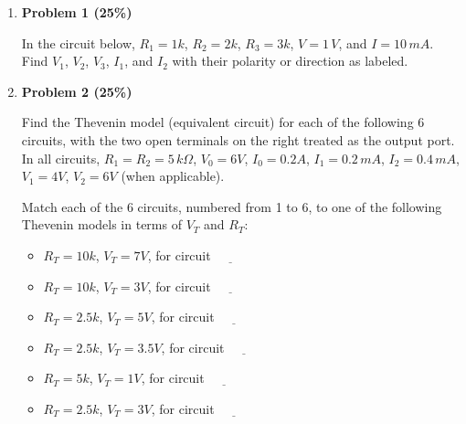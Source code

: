 \documentclass[12pt]{article}
\begin{document}
\begin{enumerate}

\item {\bf Problem 1 (25\%)} 

In the circuit below, $R_1=1k$, $R_2=2k$, $R_3=3k$, $V=1\,V$, and $I=10\,mA$.
Find $V_1$, $V_2$, $V_3$, $I_1$, and $I_2$ with their polarity or direction
as labeled.





\item {\bf Problem 2 (25\%)} 

Find the Thevenin model (equivalent circuit) for each of the following 6
circuits, with the two open terminals on the right treated as the output
port. In all circuits, $R_1=R_2=5\,k\Omega$, $V_0=6V$, $I_0=0.2A$, $I_1=0.2\,mA$,
$I_2=0.4\,mA$, $V_1=4V$, $V_2=6V$ (when applicable).

Match each of the 6 circuits, numbered from 1 to 6, to one of the following
Thevenin models in terms of $V_T$ and $R_T$:
\begin{itemize}
\item $R_T=10k$, $V_T=7V$, for circuit $\underline{\hspace{1cm}}$
\item $R_T=10k$, $V_T=3V$, for circuit $\underline{\hspace{1cm}}$
\item $R_T=2.5k$, $V_T=5V$, for circuit $\underline{\hspace{1cm}}$
\item $R_T=2.5k$, $V_T=3.5V$, for circuit $\underline{\hspace{1cm}}$
\item $R_T=5k$, $V_T=1V$, for circuit $\underline{\hspace{1cm}}$
\item $R_T=2.5k$, $V_T=3V$, for circuit $\underline{\hspace{1cm}}$
\end{itemize}



\end{enumerate}
\end{document}
